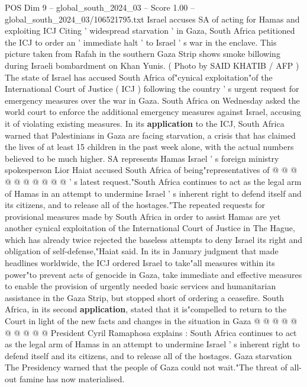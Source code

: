 \begin{textsample}{POS Dim 9 – global\_south\_2024\_03 – Score 1.00 – global\_south\_2024\_03/106521795.txt}  \label{ex:f9_pos_072}
Israel accuses SA of acting for Hamas and exploiting ICJ Citing ' widespread starvation ' in Gaza, South Africa petitioned the ICJ to order an ' immediate halt ' to Israel ' s war in the enclave.
This picture taken from Rafah in the southern Gaza Strip shows smoke billowing during Israeli bombardment on Khan Yunis. ( Photo by SAID KHATIB / AFP ) The state of Israel has accused South Africa of"cynical exploitation"of the International Court of Justice ( ICJ ) following the country ' s urgent request for emergency measures over the war in Gaza.
South Africa on Wednesday asked the world court to enforce the additional emergency measures against Israel, accusing it of violating existing measures.
In its \textbf{application} to the ICJ, South Africa warned that Palestinians in Gaza are facing starvation, a crisis that has claimed the lives of at least 15 children in the past week alone, with the actual numbers believed to be much higher.
SA represents Hamas Israel ' s foreign ministry spokesperson Lior Haiat accused South Africa of being"representatives of @ @ @ @ @ @ @ @ @ @ ' s latest request."South Africa continues to act as the legal arm of Hamas in an attempt to undermine Israel ' s inherent right to defend itself and its citizens, and to release all of the hostages."The repeated requests for provisional measures made by South Africa in order to assist Hamas are yet another cynical exploitation of the International Court of Justice in The Hague, which has already twice rejected the baseless attempts to deny Israel its right and obligation of self-defense,"Haiat said.
In its in January judgment that made headlines worldwide, the ICJ ordered Israel to take"all measures within its power"to prevent acts of genocide in Gaza, take immediate and effective measures to enable the provision of urgently needed basic services and humanitarian assistance in the Gaza Strip, but stopped short of ordering a ceasefire.
South Africa, in its second \textbf{application}, stated that it is"compelled to return to the Court in light of the new facts and changes in the situation in Gaza @ @ @ @ @ @ @ @ @ @ President Cyril Ramaphosa explains : South Africa continues to act as the legal arm of Hamas in an attempt to undermine Israel ' s inherent right to defend itself and its citizens, and to release all of the hostages.
Gaza starvation The Presidency warned that the people of Gaza could not wait."The threat of all-out famine has now materialised.

\end{textsample}
